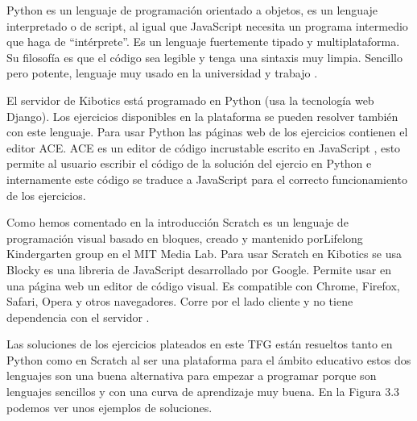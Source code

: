 Python es un lenguaje de programación orientado a objetos, es un lenguaje interpretado o de script, al igual que JavaScript necesita un programa intermedio que haga de ``intérprete''. Es un lenguaje fuertemente tipado y multiplataforma. Su filosofía es que el código sea legible y tenga  una sintaxis muy limpia. Sencillo pero potente, lenguaje muy usado en la universidad y trabajo \cite{python}.

El servidor de Kibotics está programado en Python (usa la tecnología web Django). Los ejercicios disponibles en la plataforma se pueden resolver también con este lenguaje. Para usar Python las páginas web de los ejercicios contienen el editor ACE. ACE es un editor de código incrustable escrito en JavaScript \cite{aceeditor}, esto permite al usuario escribir el código de la solución del ejercio en Python e internamente este código se traduce a JavaScript para el correcto funcionamiento de los ejercicios. 

Como hemos comentado en la introducción Scratch es un lenguaje de programación visual basado en bloques, creado y mantenido porLifelong Kindergarten group en el MIT Media Lab. Para usar Scratch en Kibotics se usa Blocky es una libreria de JavaScript desarrollado por Google. Permite usar en una página web un editor de código visual. Es compatible con Chrome, Firefox, Safari, Opera y otros navegadores. Corre por el lado cliente y no tiene dependencia con el servidor \cite{blocky}.


Las soluciones de los ejercicios plateados en este TFG están resueltos tanto en Python como en Scratch al ser una plataforma para el ámbito educativo estos dos lenguajes son una buena alternativa para empezar a programar porque son lenguajes sencillos y con una curva de aprendizaje muy buena. En la Figura 3.3 podemos ver unos ejemplos de soluciones.

